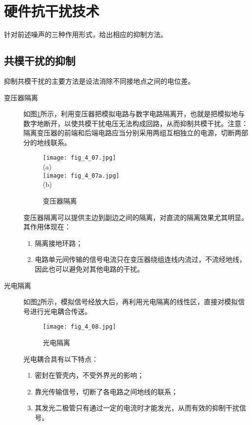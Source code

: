 \section{硬件抗干扰技术}

针对前述噪声的三种作用形式，给出相应的抑制方法。

\subsection{共模干扰的抑制}
抑制共模干扰的主要方法是设法消除不同接地点之间的电位差。
\begin{description}
  \item[变压器隔离] 如图\ref{fig_4_07}所示，利用变压器把模拟电路与数字电路隔离开，也就是把模拟地与数字地断开，以使共模干扰电压无法构成回路，从而抑制共模干扰。注意：隔离变压器的前端和后端电路应当分别采用两组互相独立的电源，切断两部分的地线联系。
\begin{figure}[h]
  \centering
  \texttt{[image: fig\_4\_07.jpg]}\\(a)\\
  \texttt{[image: fig\_4\_07a.jpg]}\\(b)\\
  \caption{变压器隔离}\label{fig_4_07}
\end{figure}

\begin{remark}
变压器隔离可以提供主边到副边之间的隔离，对直流的隔离效果尤其明显。其作用体现在：
\begin{enumerate}
  \item 隔离接地环路；
  \item 电路单元间传输的信号电流只在变压器绕组连线内流过，不流经地线，因此也可以避免对其他电路的干扰。
\end{enumerate}


\end{remark}

  \item[光电隔离]
  如图\ref{fig_4_08}所示，模拟信号经放大后，再利用光电隔离的线性区，直接对模拟信号进行光电耦合传送。


\begin{figure}[h]
  \centering
  \texttt{[image: fig\_4\_08.jpg]}\\
  \caption{光电隔离}\label{fig_4_08}
\end{figure}

  \begin{remark}
  光电耦合具有以下特点：
  \begin{enumerate}
    \item 密封在管壳内，不受外界光的影响；
    \item 靠光传输信号，切断了各电路之间地线的联系；
    \item 其发光二极管只有通过一定的电流时才能发光，从而有效的抑制干扰信号。
  \end{enumerate}
  \end{remark}



\end{description}
